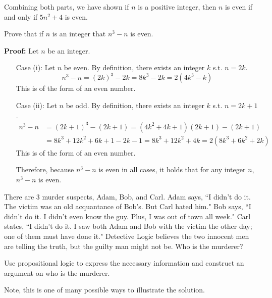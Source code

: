 \documentclass[12pt,addpoints]{exam}
\begin{document}
\begin{questions}
\begin{solution}
    \smallskip
    Combining both parts, we have shown if $n$ is a positive integer,
    then $n$ is even if and only if $5n^2+4$ is even.
\end{solution}


\question[10] Prove that if $n$ is an integer that $n^3 - n$ is even.
    \ifprintanswers
        \vspace{-10pt}
    \fi
\begin{solution} \textbf{Proof:} Let $n$ be an integer.
    \begin{itemize}[itemsep=0pt,parsep=0pt,topsep=0pt,partopsep=0pt]
        \item[Case] (i): Let $n$ be even. By definition, there exists an integer $k$ s.t. $n=2k$.
            \[ n^3 - n = (2k)^3 - 2k = 8k^3 - 2k = 2(4k^3 - k) \]
        This is of the form of an even number.
        \item[Case] (ii):  Let $n$ be odd.  By definition, there exists an integer $k$ s.t. $n = 2k+1$.
            \begin{align*}
                n^3 - n &= (2k+1)^3 - (2k+1) = (4k^2 + 4k+ 1)(2k + 1) - (2k+1) \\
                &= 8k^3 + 12k^2 + 6k + 1 - 2k - 1 = 8k^3 + 12k^2 + 4k = 2(8k^3 + 6k^2 + 2k)
            \end{align*}
        This is of the form of an even number.
        
        Therefore, because $n^3 - n$ is even in all cases, it holds that for any integer $n$, $n^3 - n$ is even.
    \end{itemize}
\end{solution}


\bonusquestion[6] There are 3 murder suspects, Adam, Bob, and Carl.  Adam says, ``I didn't do it.  The victim was an old acquantance of Bob's.  But Carl hated him."  Bob says, ``I didn't do it.  I didn't even know the guy.  Plus, I was out of town all week."  Carl states, ``I didn't do it.  I saw both Adam and Bob with the victim the other day; one of them must have done it."  Detective Logic believes the two innocent men are telling the truth, but the guilty man might not be.  Who is the murderer?  

Use propositional logic to express the necessary information and construct an argument on who is the murderer.

\begin{solution} Note, this is one of many possible ways to illustrate the solution.


\end{solution}
\end{questions}
\end{document}
